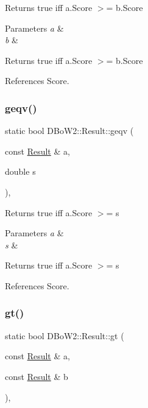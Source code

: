 Returns true iff a.\+Score $>$= b.\+Score 
\begin{DoxyParams}{Parameters}
{\em a} & \\
\hline
{\em b} & \\
\hline
\end{DoxyParams}
\begin{DoxyReturn}{Returns}
true iff a.\+Score $>$= b.\+Score 
\end{DoxyReturn}


References Score.

\mbox{\label{classDBoW2_1_1Result_a2cb32089cbe5dffaa5b60fb1b410a713}} 
\subsubsection{\texorpdfstring{geqv()}{geqv()}}
{\footnotesize\ttfamily static bool D\+Bo\+W2\+::\+Result\+::geqv (\begin{DoxyParamCaption}\item[{const \hyperlink{classDBoW2_1_1Result}{Result} \&}]{a,  }\item[{double}]{s }\end{DoxyParamCaption})\hspace{0.3cm}{\ttfamily [inline]}, {\ttfamily [static]}}

Returns true iff a.\+Score $>$= s 
\begin{DoxyParams}{Parameters}
{\em a} & \\
\hline
{\em s} & \\
\hline
\end{DoxyParams}
\begin{DoxyReturn}{Returns}
true iff a.\+Score $>$= s 
\end{DoxyReturn}


References Score.

\mbox{\label{classDBoW2_1_1Result_a6af72ce2de8c7e1707550520d9c7e422}} 
\subsubsection{\texorpdfstring{gt()}{gt()}}
{\footnotesize\ttfamily static bool D\+Bo\+W2\+::\+Result\+::gt (\begin{DoxyParamCaption}\item[{const \hyperlink{classDBoW2_1_1Result}{Result} \&}]{a,  }\item[{const \hyperlink{classDBoW2_1_1Result}{Result} \&}]{b }\end{DoxyParamCaption})\hspace{0.3cm}{\ttfamily [inline]}, {\ttfamily [static]}}

